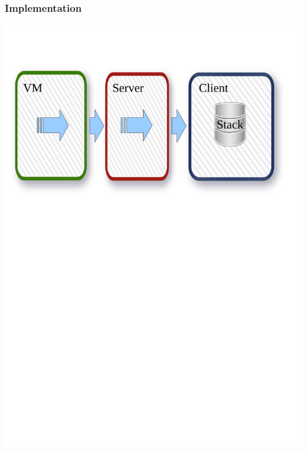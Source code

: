 \begin{frame}
	\frametitle{Implementation}
	\begin{center}
		\includegraphics[scale=0.5]{scopes/stacks.pdf}
	\end{center}
\end{frame}

